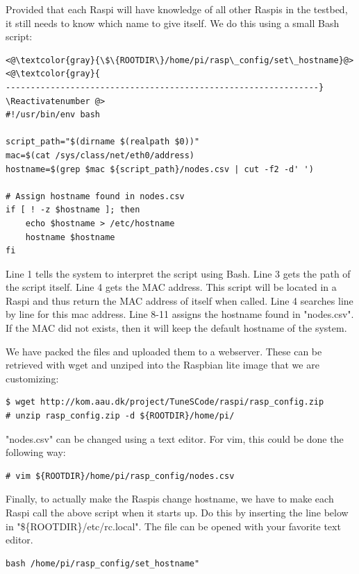 Provided that each \ac{Raspi} will have knowledge of all other \ac{Raspi}s in
the testbed, it still needs to know which name to give itself.
We do this using a small Bash script:

\Suppressnumber\begin{lstlisting}[]
<@\textcolor{gray}{\$\{ROOTDIR\}/home/pi/rasp\_config/set\_hostname}@>
<@\textcolor{gray}{
---------------------------------------------------------------}
\Reactivatenumber @>
#!/usr/bin/env bash

script_path="$(dirname $(realpath $0))"
mac=$(cat /sys/class/net/eth0/address)
hostname=$(grep $mac ${script_path}/nodes.csv | cut -f2 -d' ')

# Assign hostname found in nodes.csv
if [ ! -z $hostname ]; then
    echo $hostname > /etc/hostname
    hostname $hostname
fi
\end{lstlisting}
\FloatBarrier

Line 1 tells the system to interpret the script using Bash. Line 3 gets the
path of the script itself. Line 4 gets the MAC address. This script will be
located in a \ac{Raspi} and thus return the MAC address of itself when called.
Line 4 searches line by line for this mac address.
Line 8-11 assigns the hostname found in "nodes.csv". If the MAC did not exists,
then it will keep the default hostname of the system.


We have packed the files and uploaded them to a webserver. These can be
retrieved with wget and unziped into the Raspbian lite image that
we are customizing:

\begin{lstlisting}[]
$ wget http://kom.aau.dk/project/TuneSCode/raspi/rasp_config.zip
# unzip rasp_config.zip -d ${ROOTDIR}/home/pi/
\end{lstlisting}
\FloatBarrier

"nodes.csv" can be changed using a text editor. For vim, this could be done
the following way:
\begin{lstlisting}[]
# vim ${ROOTDIR}/home/pi/rasp_config/nodes.csv
\end{lstlisting}
\FloatBarrier


Finally, to actually make the \ac{Raspi}s change hostname, we have to make
each \ac{Raspi} call the above script when it starts up.
Do this by inserting the line below in "\$\{ROOTDIR\}/etc/rc.local".
The file
can be opened with your favorite text editor.

\begin{lstlisting}[]
bash /home/pi/rasp_config/set_hostname"
\end{lstlisting}
\FloatBarrier


